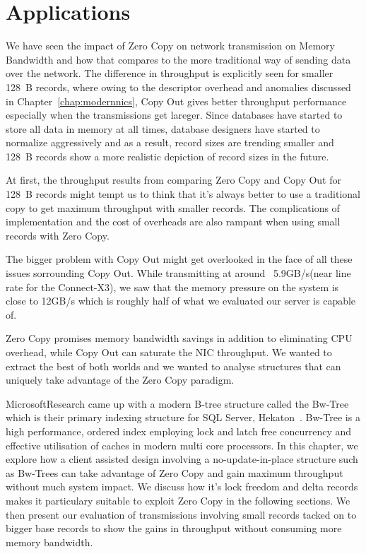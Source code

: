 
\chapter{Applications}
\label{chap:applications}

We have seen the impact of Zero Copy on network transmission on Memory Bandwidth and how that 
compares to the more traditional way of sending data over the network. The difference
in throughput is explicitly seen for smaller 128~B records, where owing to the descriptor overhead and anomalies discussed 
in Chapter~\ref{chap:modernnics}, Copy Out gives better throughput performance especially when the transmissions get lareger.
Since databases have started to store all data in memory at all times, database designers have started to normalize 
aggressively and as a result, record sizes are trending smaller and 128~B records show
a more realistic depiction of record sizes in the future. 

At first, the throughput results from comparing Zero Copy and Copy Out for 128~B 
records might tempt us to think that it's always better to use a traditional copy to get maximum throughput with smaller records.
The complications of implementation and the cost of overheads are also rampant when using small records with Zero Copy.

The bigger problem with Copy Out might get overlooked in the face of all these issues sorrounding Copy Out.
While transmitting at around ~5.9GB/s(near line rate for the Connect-X3\textregistered),
we saw that the memory pressure on the system is close to 12GB/s which is roughly half of what we evaluated our server is capable of.

Zero Copy promises memory bandwidth savings in addition to eliminating CPU overhead, 
while Copy Out can saturate the NIC throughput. We wanted to extract the best of both worlds 
and we wanted to analyse structures that can uniquely take advantage of the 
Zero Copy paradigm. 

Microsoft\textregistered Research came up with a modern B-tree structure called 
the Bw-Tree~\cite{bw-tree} which is their primary indexing structure for SQL Server, Hekaton~\cite{hekaton}.
Bw-Tree is a high performance, ordered index employing lock and latch free concurrency and effective utilisation of caches in 
modern multi core processors. In this chapter, we explore how a client assisted design involving a no-update-in-place 
structure such as Bw-Trees can take advantage of Zero Copy and gain maximum throughput 
without much system impact. We discuss how it's lock freedom and delta records makes it 
particulary suitable to exploit Zero Copy in the following sections. We then present
our evaluation of transmissions involving small records tacked on to bigger base records
to show the gains in throughput without consuming more memory bandwidth. 

